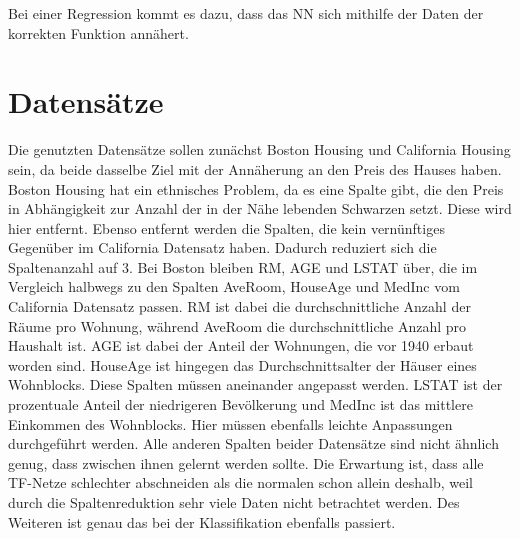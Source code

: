 Bei einer Regression kommt es dazu, dass das NN sich mithilfe 
der Daten der korrekten Funktion annähert.

\section{Datensätze}
    Die genutzten Datensätze sollen zunächst Boston Housing und California Housing sein, da 
    beide dasselbe Ziel mit der Annäherung an den Preis des Hauses haben. 
    Boston Housing hat ein ethnisches Problem, da es eine Spalte gibt, die den Preis in 
    Abhängigkeit zur Anzahl der in der Nähe lebenden Schwarzen setzt. Diese wird hier entfernt. 
    Ebenso entfernt werden die Spalten, die kein vernünftiges Gegenüber im California Datensatz 
    haben. Dadurch reduziert sich die Spaltenanzahl auf 3. Bei Boston bleiben RM, AGE und LSTAT 
    über, die im Vergleich halbwegs zu den Spalten AveRoom, HouseAge und MedInc vom California 
    Datensatz passen. 
    RM ist dabei die durchschnittliche Anzahl der Räume pro Wohnung, während AveRoom die 
    durchschnittliche Anzahl pro Haushalt ist. 
    AGE ist dabei der Anteil der Wohnungen, die vor 1940 erbaut worden sind. HouseAge ist 
    hingegen das Durchschnittsalter der Häuser eines Wohnblocks. Diese Spalten müssen 
    aneinander angepasst werden.
    LSTAT ist der prozentuale Anteil der niedrigeren Bevölkerung und MedInc ist das mittlere 
    Einkommen des Wohnblocks. Hier müssen ebenfalls leichte Anpassungen durchgeführt werden. 
    Alle anderen Spalten beider Datensätze sind nicht ähnlich genug, dass zwischen ihnen 
    gelernt werden sollte. Die Erwartung ist, dass alle TF-Netze schlechter abschneiden als die 
    normalen schon allein deshalb, weil durch die Spaltenreduktion sehr viele Daten nicht 
    betrachtet werden. Des Weiteren ist genau das bei der Klassifikation ebenfalls passiert.